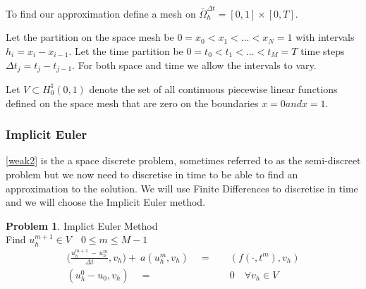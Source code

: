 \documentclass{uonmathreport}
\theoremstyle{definition}
\theoremstyle{problem}
\newtheorem{problem}{Problem}[section]
\theoremstyle{theorem}
\begin{document}
To find our approximation define a mesh on $\bar{\Omega}^{\Delta t}_h =[0, 1] \times [0, T]$.\\

\begin{center}
\end{center}

Let the partition on the space mesh be $0 = x_0< x_1< ...< x_N = 1$ with intervals\\ $h_i = x_i - x_{i-1}$. Let the time partition be $0 = t_0< t_1< ...< t_M = T$ time steps $\Delta t_j = t_j - t_{j-1}$. For both space and time we allow the intervals to vary.

Let $V\subset H^1_0(0, 1)$ denote the set of all continuous piecewise linear functions defined on the space mesh that are zero on the boundaries $x=0 and x=1$. 

\subsubsection{Implicit Euler} \label{subsubsec:Implicit Euler}

\ref{weak2} is the a space discrete problem, sometimes referred to as the semi-discreet problem but we now need to discretise in time to be able to find an approximation to the solution. We will use Finite Differences to discretise in time and we will choose the Implicit Euler method. 


\begin{problem}{Implict Euler Method} \label{eq:Implicit Euler}
\\Find $u_h^{m+1} \in V \quad 0 \leq m \leq M-1$
\begin{align*}
\Big(\frac{u_h^{m+1} \, - \, u_h^{m}}{\Delta t}, v_h \Big) +\: a(u_h^m, v_h) \quad=&\quad (f(\cdot, t^m), v_h) \\
(u^{0}_h - u_0, v_h)\quad  =& \quad0 \quad \forall v_h \in V
\end{align*}
\end{problem}
\end{document}
